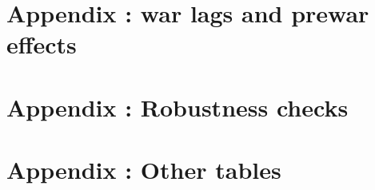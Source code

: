 \documentclass[12pt,a4paper,titlepage,english]{article}
\begin{document}
\clearpage
\appendix
\section{Appendix : war lags and prewar effects}






\clearpage




\clearpage
\section{Appendix : Robustness checks}










\clearpage
\section{Appendix : Other tables}



\clearpage





\end{document}
